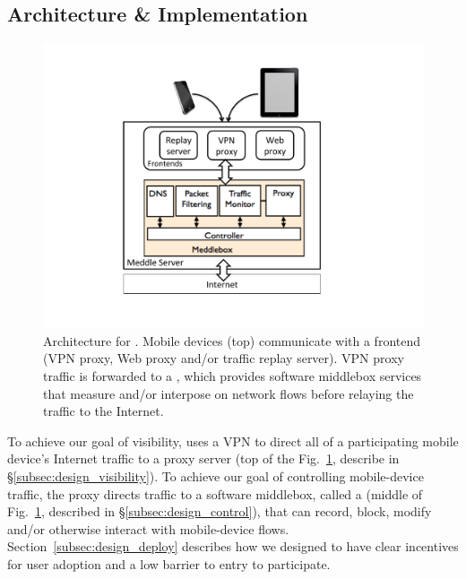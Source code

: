   

\subsection{Architecture \& Implementation}
\begin{figure}[tb]
\centering
\includegraphics[width=0.8\columnwidth]{figures/meddle-diagram.pdf}
\caption{Architecture for \meddle. Mobile devices (top) communicate with 
a \meddle frontend (VPN proxy, Web proxy and/or 
traffic replay server). VPN proxy traffic is forwarded to a \meddlebox, which provides 
software middlebox services that measure and/or interpose on network flows before 
relaying the traffic to the Internet.  }
\vspace{\postfigspace}
\label{fig:architecture}
\end{figure}

To achieve our goal of visibility, \meddle uses a VPN to direct all of a participating 
mobile device's Internet traffic to a proxy server (top of the Fig.~\ref{fig:architecture}, 
describe in \S\ref{subsec:design_visibility}). To achieve our goal of controlling mobile-device traffic, 
the \meddle proxy directs traffic to a software middlebox, called a \meddlebox (middle of Fig.~\ref{fig:architecture}, described in \S\ref{subsec:design_control}),
that can record, block, modify and/or otherwise interact with mobile-device flows. 
Section~\ref{subsec:design_deploy} describes how we designed \meddle to have clear 
incentives for user adoption and a low barrier to entry to participate.






